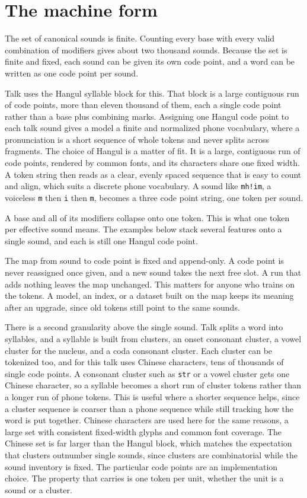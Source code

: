 \section{The machine form}

The set of canonical sounds is finite. Counting every base with every valid combination of modifiers gives about two thousand sounds. Because the set is finite and fixed, each sound can be given its own code point, and a word can be written as one code point per sound.

Talk uses the Hangul syllable block for this. That block is a large contiguous run of code points, more than eleven thousand of them, each a single code point rather than a base plus combining marks. Assigning one Hangul code point to each talk sound gives a model a finite and normalized phone vocabulary, where a pronunciation is a short sequence of whole tokens and never splits across fragments. The choice of Hangul is a matter of fit. It is a large, contiguous run of code points, rendered by common fonts, and its characters share one fixed width. A token string then reads as a clear, evenly spaced sequence that is easy to count and align, which suits a discrete phone vocabulary. A sound like \verb|mh!im|, a voiceless \verb|m| then \verb|i| then \verb|m|, becomes a three code point string, one token per sound.

A base and all of its modifiers collapse onto one token. This is what one token per effective sound means. The examples below stack several features onto a single sound, and each is still one Hangul code point.



The map from sound to code point is fixed and append-only. A code point is never reassigned once given, and a new sound takes the next free slot. A run that adds nothing leaves the map unchanged. This matters for anyone who trains on the tokens. A model, an index, or a dataset built on the map keeps its meaning after an upgrade, since old tokens still point to the same sounds.

There is a second granularity above the single sound. Talk splits a word into syllables, and a syllable is built from clusters, an onset consonant cluster, a vowel cluster for the nucleus, and a coda consonant cluster. Each cluster can be tokenized too, and for this talk uses Chinese characters, tens of thousands of single code points. A consonant cluster such as \verb|str| or a vowel cluster gets one Chinese character, so a syllable becomes a short run of cluster tokens rather than a longer run of phone tokens. This is useful where a shorter sequence helps, since a cluster sequence is coarser than a phone sequence while still tracking how the word is put together. Chinese characters are used here for the same reasons, a large set with consistent fixed-width glyphs and common font coverage. The Chinese set is far larger than the Hangul block, which matches the expectation that clusters outnumber single sounds, since clusters are combinatorial while the sound inventory is fixed. The particular code points are an implementation choice. The property that carries is one token per unit, whether the unit is a sound or a cluster.

